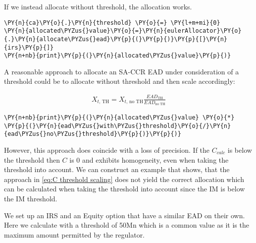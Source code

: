     If we instead allocate without threshold, the allocation works.

    \begin{tcolorbox}[breakable, size=fbox, boxrule=1pt, pad at break*=1mm,colback=cellbackground, colframe=cellborder]
\begin{Verbatim}[commandchars=\\\{\}]
\PY{n}{ca}\PY{o}{.}\PY{n}{threshold} \PY{o}{=} \PY{l+m+mi}{0}
\PY{n}{allocated\PYZus{}value}\PY{o}{=}\PY{n}{eulerAllocator}\PY{o}{.}\PY{n}{allocate\PYZus{}ead}\PY{p}{(}\PY{p}{)}\PY{p}{[}\PY{n}{irs}\PY{p}{]}
\PY{n+nb}{print}\PY{p}{(}\PY{n}{allocated\PYZus{}value}\PY{p}{)}
\end{Verbatim}
\end{tcolorbox}

    A reasonable approach to allocate an SA-CCR EAD under consideration of a
threshold could be to allocate without threshold and then scale
accordingly:

\begin{align}
\label{eq:C threshold scaling}
    X_{t\text{, TH}} = X_{t\text{, no TH}} \frac{EAD_{\text{TH}}}{EAD_{\text{no TH}}}
\end{align}

    \begin{tcolorbox}[breakable, size=fbox, boxrule=1pt, pad at break*=1mm,colback=cellbackground, colframe=cellborder]
\begin{Verbatim}[commandchars=\\\{\}]
\PY{n+nb}{print}\PY{p}{(}\PY{n}{allocated\PYZus{}value} \PY{o}{*} \PY{p}{(}\PY{n}{ead\PYZus{}with\PYZus{}threshold}\PY{o}{/}\PY{n}{ead\PYZus{}no\PYZus{}threshold}\PY{p}{)}\PY{p}{)}
\end{Verbatim}
\end{tcolorbox}

    However, this approach does coincide with a loss of precision. If the
\(C_{calc}\) is below the threshold then \(C\) is 0 and exhibits
homogeneity, even when taking the threshold into account. We can
construct an example that shows, that the approach in
\ref{eq:C threshold scaling} does not yield the correct allocation which
can be calculated when taking the threshold into account since the IM is
below the IM threshold.

We set up an IRS and an Equity option that have a similar EAD on their
own. Here we calculate with a threshold of 50Mn which is a common value
as it is the maximum amount permitted by the regulator.

